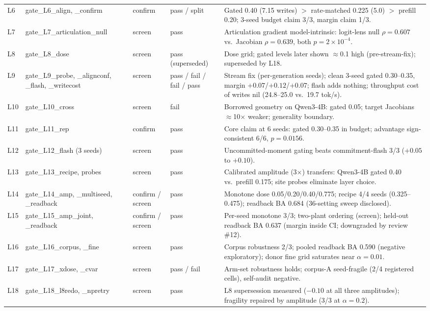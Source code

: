 \begin{table}[t]
{\begin{tabular}{lp{3.5cm}p{1.9cm}p{2.6cm}p{6.6cm}}
L6  & gate\_L6\_align, \_confirm & confirm & pass / split & Gated 0.40 (7.15 writes) $>$ rate-matched 0.225 (5.0) $>$ prefill 0.20; 3-seed budget claim 3/3, margin claim 1/3. \\
L7  & gate\_L7\_articulation\_null & screen & pass & Articulation gradient model-intrinsic: logit-lens null $\rho=0.607$ vs.\ Jacobian $\rho=0.639$, both $p=2\times10^{-4}$. \\
L8  & gate\_L8\_dose & screen & pass (superseded) & Dose grid; gated levels later shown $\approx$0.1 high (pre-stream-fix); superseded by L18. \\
L9  & gate\_L9\_probe, \_alignconf, \_flash, \_writecost & screen & pass / fail / fail / pass & Stream fix (per-generation seeds); clean 3-seed gated 0.30--0.35, margin $+0.07$/$+0.12$/$+0.07$; flash adds nothing; throughput cost of writes nil (24.8--25.0 vs.\ 19.7 tok/s). \\
L10 & gate\_L10\_cross & screen & fail & Borrowed geometry on Qwen3-4B: gated 0.05; target Jacobians $\approx$10$\times$ weaker; generality boundary. \\
L11 & gate\_L11\_rep & confirm & pass & Core claim at 6 seeds: gated 0.30--0.35 in budget; advantage sign-consistent 6/6, $p=0.0156$. \\
L12 & gate\_L12\_flash (3 seeds) & screen & pass & Uncommitted-moment gating beats commitment-flash 3/3 ($+0.05$ to $+0.10$). \\
L13 & gate\_L13\_recipe, probes & screen & pass & Calibrated amplitude (3$\times$) transfers: Qwen3-4B gated 0.40 vs.\ prefill 0.175; site probes eliminate layer choice. \\
L14 & gate\_L14\_amp, \_multiseed, \_readback & confirm / screen & pass & Monotone dose 0.05/0.20/0.40/0.775; recipe 4/4 seeds (0.325--0.475); readback BA 0.684 (36-setting sweep disclosed). \\
L15 & gate\_L15\_amp\_joint, \_readback & confirm / screen & pass & Per-seed monotone 3/3; two-plant ordering (screen); held-out readback BA 0.637 (margin inside CI; downgraded by review \#12). \\
L16 & gate\_L16\_corpus, \_fine & screen & pass & Corpus robustness 2/3; pooled readback BA 0.590 (negative exploratory); donor fine grid saturates near $\alpha=0.01$. \\
L17 & gate\_L17\_xdose, \_cvar & screen & pass / fail & Arm-set robustness holds; corpus-A seed-fragile (2/4 registered cells), self-audit negative. \\
L18 & gate\_L18\_l8redo, \_npretry & screen & pass & L8 supersession measured ($-0.10$ at all three amplitudes); fragility repaired by amplitude (3/3 at $\alpha=0.2$). \\

\end{tabular}}
\end{table}
